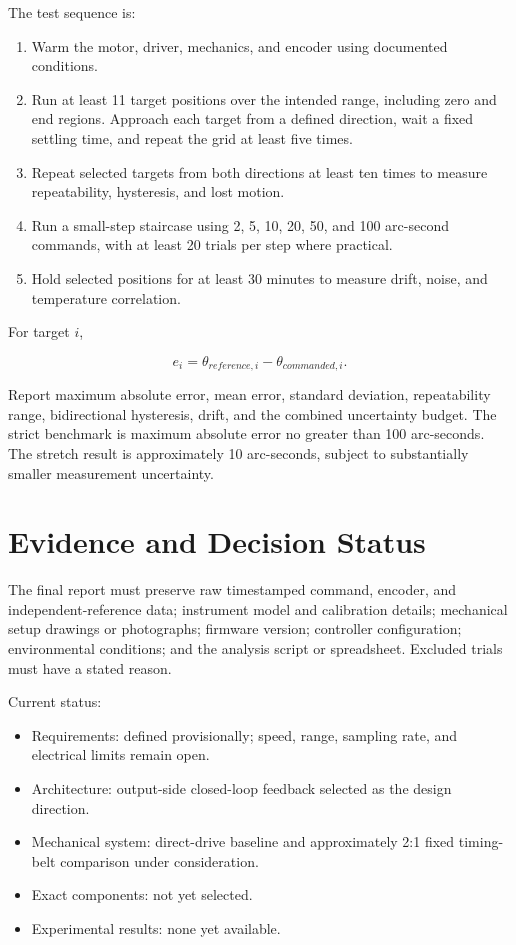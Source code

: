\documentclass[11pt,a4paper]{article}
\begin{document}
The test sequence is:
\begin{enumerate}
  \item Warm the motor, driver, mechanics, and encoder using documented conditions.
  \item Run at least 11 target positions over the intended range, including zero and end regions. Approach each target from a defined direction, wait a fixed settling time, and repeat the grid at least five times.
  \item Repeat selected targets from both directions at least ten times to measure repeatability, hysteresis, and lost motion.
  \item Run a small-step staircase using 2, 5, 10, 20, 50, and 100 arc-second commands, with at least 20 trials per step where practical.
  \item Hold selected positions for at least 30 minutes to measure drift, noise, and temperature correlation.
\end{enumerate}

For target $i$,

\begin{equation}
e_i=\theta_{reference,i}-\theta_{commanded,i}.
\end{equation}

Report maximum absolute error, mean error, standard deviation, repeatability range, bidirectional hysteresis, drift, and the combined uncertainty budget. The strict benchmark is maximum absolute error no greater than 100 arc-seconds. The stretch result is approximately 10 arc-seconds, subject to substantially smaller measurement uncertainty.

\section{Evidence and Decision Status}

The final report must preserve raw timestamped command, encoder, and independent-reference data; instrument model and calibration details; mechanical setup drawings or photographs; firmware version; controller configuration; environmental conditions; and the analysis script or spreadsheet. Excluded trials must have a stated reason.

Current status:
\begin{itemize}
  \item Requirements: defined provisionally; speed, range, sampling rate, and electrical limits remain open.
  \item Architecture: output-side closed-loop feedback selected as the design direction.
  \item Mechanical system: direct-drive baseline and approximately 2:1 fixed timing-belt comparison under consideration.
  \item Exact components: not yet selected.
  \item Experimental results: none yet available.
\end{itemize}
\end{document}
